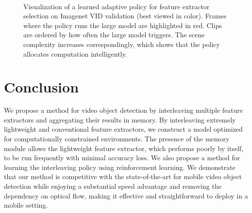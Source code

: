 \documentclass[10pt,twocolumn,letterpaper]{article}
\begin{document}
\begin{figure*}[!htb]
{
}
\\\vspace{-0.5em}
\caption{Visualization of a learned adaptive policy for feature extractor selection on Imagenet VID validation (best viewed in color). Frames where the policy runs the large model are highlighted in red. Clips are ordered by how often the large model triggers. The scene complexity increases correspondingly, which shows that the policy allocates computation intelligently.}
\label{fig:visualization}
\end{figure*}


\section{Conclusion}
We propose a method for video object detection by interleaving multiple feature extractors and aggregating their results in memory. By interleaving extremely lightweight and conventional feature extractors, we construct a model optimized for computationally constrained environments. The presence of the memory module allows the lightweight feature extractor, which performs poorly by itself, to be run frequently with minimal accuracy loss. We also propose a method for learning the interleaving policy using reinforcement learning. We demonstrate that our method is competitive with the state-of-the-art for mobile video object detection while enjoying a substantial speed advantage and removing the dependency on optical flow, making it effective and straightforward to deploy in a mobile setting.


\clearpage


{\small


}
\end{document}
